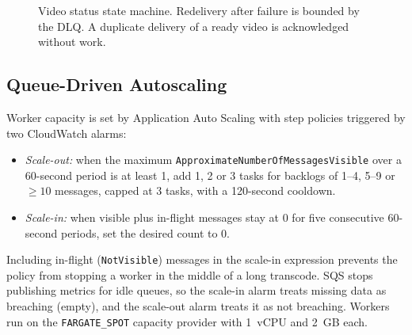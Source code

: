 \documentclass[conference]{IEEEtran}
\begin{document}
\begin{figure}[t]
\centering
{}
\caption{Video status state machine. Redelivery after failure is bounded by the DLQ. A duplicate delivery of a ready video is acknowledged without work.}
\label{fig:fsm}
\end{figure}

\subsection{Queue-Driven Autoscaling}
Worker capacity is set by Application Auto Scaling with step policies triggered by two CloudWatch alarms:
\begin{itemize}
  \item \emph{Scale-out:} when the maximum \texttt{ApproximateNumberOfMessagesVisible} over a 60-second period is at least 1, add 1, 2 or 3 tasks for backlogs of 1--4, 5--9 or $\ge 10$ messages, capped at 3 tasks, with a 120-second cooldown.
  \item \emph{Scale-in:} when visible plus in-flight messages stay at 0 for five consecutive 60-second periods, set the desired count to 0.
\end{itemize}
Including in-flight (\texttt{NotVisible}) messages in the scale-in expression prevents the policy from stopping a worker in the middle of a long transcode. SQS stops publishing metrics for idle queues, so the scale-in alarm treats missing data as breaching (empty), and the scale-out alarm treats it as not breaching. Workers run on the \texttt{FARGATE\_SPOT} capacity provider with 1~vCPU and 2~GB each.
\end{document}
